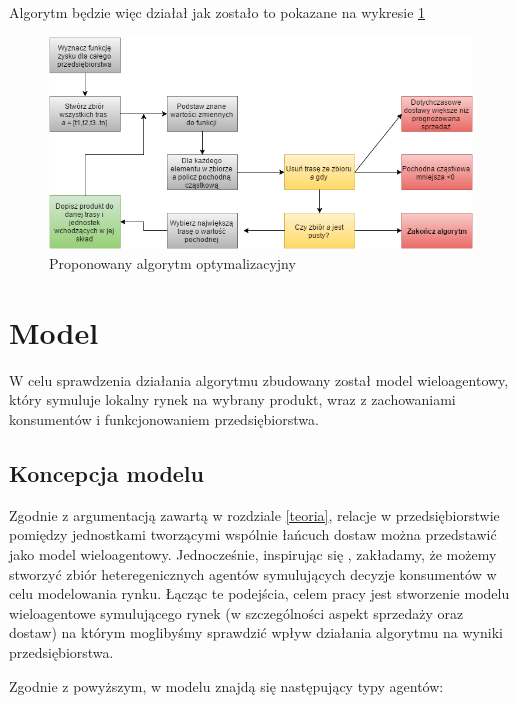 \documentclass[polish, twoside, 12pt, a4paper]{article}
\theoremstyle{definition}
\theoremstyle{plain}
\theoremstyle{remark}
\begin{document}
Algorytm będzie więc działał jak zostało to pokazane na wykresie \ref{fig:diagramoptymalizacyny}

\begin{figure}
  \centering
\includegraphics[width=\linewidth]{pictures/diagramoptymalizacyny.png}
  \caption{Proponowany algorytm optymalizacyjny}
  \label{fig:diagramoptymalizacyny}

\end{figure}

\clearpage

\section{Model}

W celu sprawdzenia działania algorytmu zbudowany został model wieloagentowy, który symuluje lokalny rynek na wybrany produkt, wraz z zachowaniami konsumentów i funkcjonowaniem przedsiębiorstwa.

\subsection{Koncepcja modelu}

Zgodnie z argumentacją zawartą w rozdziale \ref{teoria}, relacje w przedsiębiorstwie pomiędzy jednostkami tworzącymi wspólnie łańcuch dostaw można przedstawić jako model wieloagentowy. Jednocześnie, inspirując się \cite{Kaminski2012}, zakładamy, że możemy stworzyć zbiór heteregenicznych agentów symulujących decyzje konsumentów w celu modelowania rynku. Łącząc te podejścia, celem pracy jest stworzenie modelu wieloagentowe symulującego rynek (w szczególności aspekt sprzedaży oraz dostaw) na którym moglibyśmy sprawdzić wpływ działania algorytmu na wyniki przedsiębiorstwa.

Zgodnie z powyższym, w modelu znajdą się następujący typy agentów: 
\end{document}
